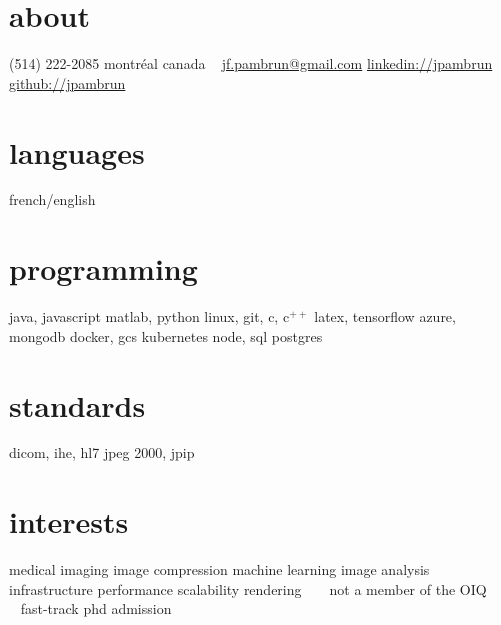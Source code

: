 \documentclass[print]{friggeri-cv}
\begin{document}

\newcommand{\eletr}{\href{http://www.etsmtl.ca/Programmes-Etudes/1er-cycle/Fiche-de-cours?Sigle=ELE747}{ele{\footnotesize747}}}
\newcommand{\eleenv}{\href{http://www.etsmtl.ca/Programmes-Etudes/1er-cycle/Fiche-de-cours?Sigle=ELE116}{ele{\footnotesize116}}}
\newcommand{\infmat}{\href{http://www.polymtl.ca/etudes/cours/details.php?sigle=INF1005a}{inf{\footnotesize1005}a}}
\newcommand{\gtssys}{\href{http://www.etsmtl.ca/Futurs-etudiants/Cycles-sup/Fiche-de-cours?Sigle=GTS840}{gts{\footnotesize840}}}

\begin{aside}
  \section{about}
  {\small(514) 222-2085}
  montréal
  canada
  ~
  \href{mailto:jf.pambrun@gmail.com}{jf.pambrun@gmail.com}
  \href{https://ca.linkedin.com/in/jpambrun}{linkedin://jpambrun}
  \href{http://github.com/jpambrun}{github://jpambrun}
  \section{languages}
  french/english
  \section{programming}
  java, javascript
  matlab, python
  linux, git, c, c{\tiny$^{++}$}
  latex, tensorflow
  azure, mongodb
  docker, gcs
  kubernetes
  node, sql
  postgres
  \section{standards}
  dicom, ihe, hl{\small7}
  jpeg {\small2000}, jpip
  \section{interests}
  medical imaging
  image compression
  machine learning
  image analysis
  infrastructure
  performance
  scalability
  rendering
  ~\vspace{2cm}
  {\footnotesize\textdagger~ not a member of the OIQ\\\textdaggerdbl~ fast-track phd admission}
\end{aside}

\end{document}
